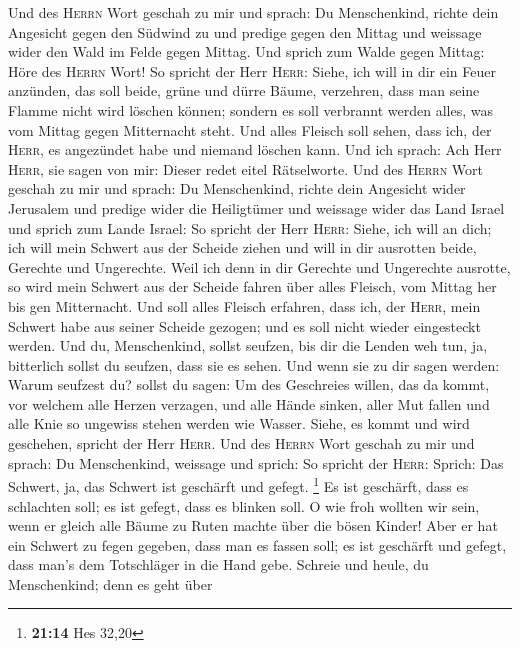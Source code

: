  Und des \textsc{Herrn} Wort geschah zu mir und sprach:
 Du Menschenkind, richte dein Angesicht gegen den Südwind
zu und predige gegen den Mittag und weissage wider den Wald im Felde
gegen Mittag.  Und sprich zum Walde gegen Mittag: Höre des
\textsc{Herrn} Wort! So spricht der Herr \textsc{Herr}: Siehe, ich will
in dir ein Feuer anzünden, das soll beide, grüne und dürre Bäume,
verzehren, dass man seine Flamme nicht wird löschen können; sondern es
soll verbrannt werden alles, was vom Mittag gegen Mitternacht steht.
 Und alles Fleisch soll sehen, dass ich, der
\textsc{Herr}, es angezündet habe und niemand löschen kann.
 Und ich sprach: Ach Herr \textsc{Herr}, sie sagen von
mir: Dieser redet eitel Rätselworte.  Und des
\textsc{Herrn} Wort geschah zu mir und sprach:  Du
Menschenkind, richte dein Angesicht wider Jerusalem und predige wider
die Heiligtümer und weissage wider das Land Israel  und
sprich zum Lande Israel: So spricht der Herr \textsc{Herr}: Siehe, ich
will an dich; ich will mein Schwert aus der Scheide ziehen und will in
dir ausrotten beide, Gerechte und Ungerechte.  Weil ich
denn in dir Gerechte und Ungerechte ausrotte, so wird mein Schwert aus
der Scheide fahren über alles Fleisch, vom Mittag her bis gen
Mitternacht.  Und soll alles Fleisch erfahren, dass ich,
der \textsc{Herr}, mein Schwert habe aus seiner Scheide gezogen; und es
soll nicht wieder eingesteckt werden.  Und du,
Menschenkind, sollst seufzen, bis dir die Lenden weh tun, ja, bitterlich
sollst du seufzen, dass sie es sehen.  Und wenn sie zu
dir sagen werden: Warum seufzest du? sollst du sagen: Um des Geschreies
willen, das da kommt, vor welchem alle Herzen verzagen, und alle Hände
sinken, aller Mut fallen und alle Knie so ungewiss stehen werden wie
Wasser. Siehe, es kommt und wird geschehen, spricht der Herr
\textsc{Herr}.  Und des \textsc{Herrn} Wort geschah zu
mir und sprach:  Du Menschenkind, weissage und sprich: So
spricht der \textsc{Herr}: Sprich: Das Schwert, ja, das Schwert ist
geschärft und gefegt. \footnote{\textbf{21:14} Hes 32,20}
 Es ist geschärft, dass es schlachten soll; es ist
gefegt, dass es blinken soll. O wie froh wollten wir sein, wenn er
gleich alle Bäume zu Ruten machte über die bösen Kinder! 
Aber er hat ein Schwert zu fegen gegeben, dass man es fassen soll; es
ist geschärft und gefegt, dass man's dem Totschläger in die Hand gebe.
 Schreie und heule, du Menschenkind; denn es geht über
